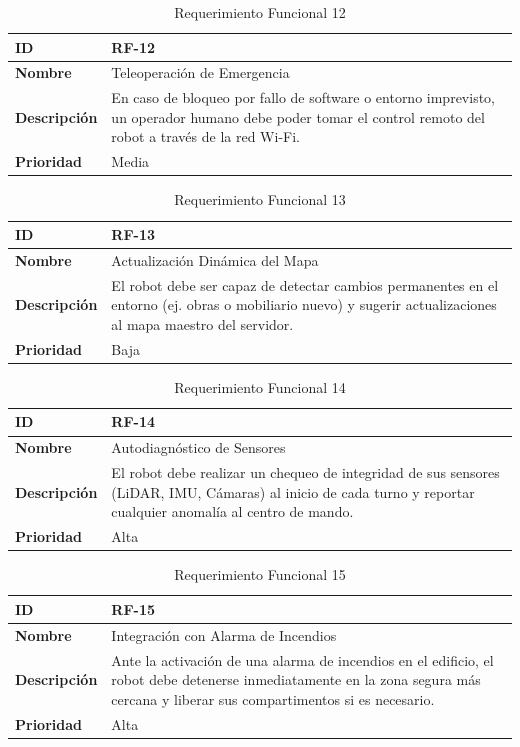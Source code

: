 \begin{table}[H]
\centering
\begin{tabular}{|l|p{10cm}|}
\hline
\textbf{ID} & RF-12 \\ \hline
\textbf{Nombre} & Teleoperación de Emergencia \\ \hline
\textbf{Descripción} & En caso de bloqueo por fallo de software o entorno imprevisto, un operador humano debe poder tomar el control remoto del robot a través de la red Wi-Fi. \\ \hline
\textbf{Prioridad} & Media \\ \hline
\end{tabular}
\caption{Requerimiento Funcional 12}
\end{table}

\begin{table}[H]
\centering
\begin{tabular}{|l|p{10cm}|}
\hline
\textbf{ID} & RF-13 \\ \hline
\textbf{Nombre} & Actualización Dinámica del Mapa \\ \hline
\textbf{Descripción} & El robot debe ser capaz de detectar cambios permanentes en el entorno (ej. obras o mobiliario nuevo) y sugerir actualizaciones al mapa maestro del servidor. \\ \hline
\textbf{Prioridad} & Baja \\ \hline
\end{tabular}
\caption{Requerimiento Funcional 13}
\end{table}

\begin{table}[H]
\centering
\begin{tabular}{|l|p{10cm}|}
\hline
\textbf{ID} & RF-14 \\ \hline
\textbf{Nombre} & Autodiagnóstico de Sensores \\ \hline
\textbf{Descripción} & El robot debe realizar un chequeo de integridad de sus sensores (LiDAR, IMU, Cámaras) al inicio de cada turno y reportar cualquier anomalía al centro de mando. \\ \hline
\textbf{Prioridad} & Alta \\ \hline
\end{tabular}
\caption{Requerimiento Funcional 14}
\end{table}

\begin{table}[H]
\centering
\begin{tabular}{|l|p{10cm}|}
\hline
\textbf{ID} & RF-15 \\ \hline
\textbf{Nombre} & Integración con Alarma de Incendios \\ \hline
\textbf{Descripción} & Ante la activación de una alarma de incendios en el edificio, el robot debe detenerse inmediatamente en la zona segura más cercana y liberar sus compartimentos si es necesario. \\ \hline
\textbf{Prioridad} & Alta \\ \hline
\end{tabular}
\caption{Requerimiento Funcional 15}
\end{table}

